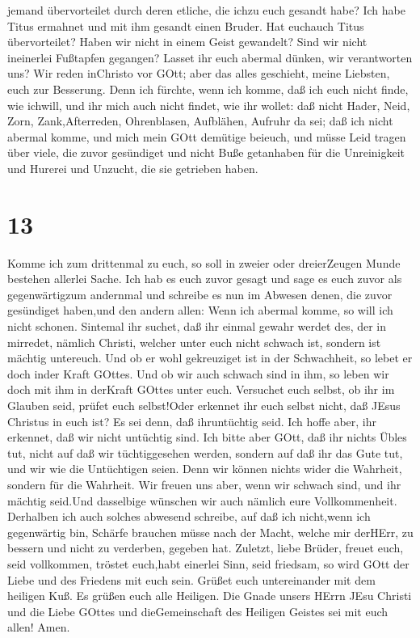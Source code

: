 jemand übervorteilet durch deren etliche, die ichzu euch gesandt habe?
 Ich habe Titus ermahnet und mit ihm gesandt einen Bruder.
Hat euchauch Titus übervorteilet? Haben wir nicht in einem Geist
gewandelt? Sind wir nicht ineinerlei Fußtapfen gegangen? 
Lasset ihr euch abermal dünken, wir verantworten uns? Wir reden
inChristo vor GOtt; aber das alles geschieht, meine Liebsten, euch zur
Besserung.  Denn ich fürchte, wenn ich komme, daß ich euch
nicht finde, wie ichwill, und ihr mich auch nicht findet, wie ihr
wollet: daß nicht Hader, Neid, Zorn, Zank,Afterreden, Ohrenblasen,
Aufblähen, Aufruhr da sei;  daß ich nicht abermal komme,
und mich mein GOtt demütige beieuch, und müsse Leid tragen über viele,
die zuvor gesündiget und nicht Buße getanhaben für die Unreinigkeit und
Hurerei und Unzucht, die sie getrieben haben.

\hypertarget{section-12}{%
\section{13}\label{section-12}}

 Komme ich zum drittenmal zu euch, so soll in zweier oder
dreierZeugen Munde bestehen allerlei Sache.  Ich hab es euch
zuvor gesagt und sage es euch zuvor als gegenwärtigzum andernmal und
schreibe es nun im Abwesen denen, die zuvor gesündiget haben,und den
andern allen: Wenn ich abermal komme, so will ich nicht schonen.
 Sintemal ihr suchet, daß ihr einmal gewahr werdet des, der
in mirredet, nämlich Christi, welcher unter euch nicht schwach ist,
sondern ist mächtig untereuch.  Und ob er wohl gekreuziget
ist in der Schwachheit, so lebet er doch inder Kraft GOttes. Und ob wir
auch schwach sind in ihm, so leben wir doch mit ihm in derKraft GOttes
unter euch.  Versuchet euch selbst, ob ihr im Glauben seid,
prüfet euch selbst!Oder erkennet ihr euch selbst nicht, daß JEsus
Christus in euch ist? Es sei denn, daß ihruntüchtig seid. 
Ich hoffe aber, ihr erkennet, daß wir nicht untüchtig sind. 
Ich bitte aber GOtt, daß ihr nichts Übles tut, nicht auf daß wir
tüchtiggesehen werden, sondern auf daß ihr das Gute tut, und wir wie die
Untüchtigen seien.  Denn wir können nichts wider die
Wahrheit, sondern für die Wahrheit.  Wir freuen uns aber,
wenn wir schwach sind, und ihr mächtig seid.Und dasselbige wünschen wir
auch nämlich eure Vollkommenheit.  Derhalben ich auch
solches abwesend schreibe, auf daß ich nicht,wenn ich gegenwärtig bin,
Schärfe brauchen müsse nach der Macht, welche mir derHErr, zu bessern
und nicht zu verderben, gegeben hat.  Zuletzt, liebe
Brüder, freuet euch, seid vollkommen, tröstet euch,habt einerlei Sinn,
seid friedsam, so wird GOtt der Liebe und des Friedens mit euch sein.
 Grüßet euch untereinander mit dem heiligen Kuß.
 Es grüßen euch alle Heiligen.  Die Gnade
unsers HErrn JEsu Christi und die Liebe GOttes und dieGemeinschaft des
Heiligen Geistes sei mit euch allen! Amen.
